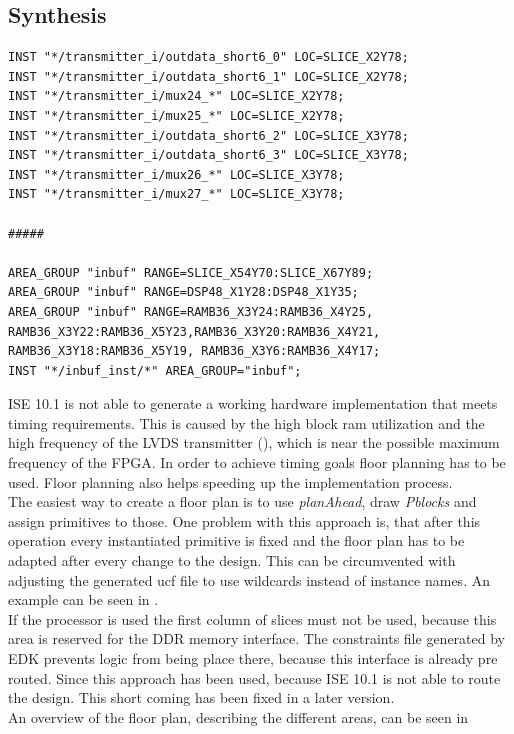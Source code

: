 \documentclass[11pt,technote,a4paper,onecolumn,dvips]{IEEEtran}
\begin{document}
\subsection{Synthesis}
\label{sec:synthesis}
\begin{lstlisting}[float,language=ucf,caption={Floor plan example},label=lst:floorplan,basicstyle=\ttfamily\tiny]
INST "*/transmitter_i/outdata_short6_0" LOC=SLICE_X2Y78;
INST "*/transmitter_i/outdata_short6_1" LOC=SLICE_X2Y78;
INST "*/transmitter_i/mux24_*" LOC=SLICE_X2Y78;
INST "*/transmitter_i/mux25_*" LOC=SLICE_X2Y78;
INST "*/transmitter_i/outdata_short6_2" LOC=SLICE_X3Y78;
INST "*/transmitter_i/outdata_short6_3" LOC=SLICE_X3Y78;
INST "*/transmitter_i/mux26_*" LOC=SLICE_X3Y78;
INST "*/transmitter_i/mux27_*" LOC=SLICE_X3Y78;

#####

AREA_GROUP "inbuf" RANGE=SLICE_X54Y70:SLICE_X67Y89;
AREA_GROUP "inbuf" RANGE=DSP48_X1Y28:DSP48_X1Y35;
AREA_GROUP "inbuf" RANGE=RAMB36_X3Y24:RAMB36_X4Y25, RAMB36_X3Y22:RAMB36_X5Y23,RAMB36_X3Y20:RAMB36_X4Y21, RAMB36_X3Y18:RAMB36_X5Y19, RAMB36_X3Y6:RAMB36_X4Y17;
INST "*/inbuf_inst/*" AREA_GROUP="inbuf";
\end{lstlisting}
ISE 10.1 is not able to generate a working hardware implementation that
meets timing requirements. This is caused by the high block ram utilization
and the high frequency of the LVDS transmitter (), which is
near the possible maximum frequency of the FPGA. In order to achieve timing
goals floor planning has to be used. Floor planning also helps speeding up
the implementation process.\\
The easiest way to create a floor plan is to use \emph{planAhead}, draw
\emph{Pblocks} and assign primitives to those. One problem with this
approach is, that after this operation every instantiated primitive
is fixed and the floor plan has to be adapted after every change to the
design. This can be circumvented with adjusting the generated ucf file
to use wildcards instead of instance names. An example can be seen in
.\\
If the processor is used the first column of slices must not be used, because
this area is reserved for the DDR memory interface. The constraints file
generated by EDK prevents logic from being place there, because this interface
is already pre routed. Since this approach has been used, because ISE 10.1 is
not able to route the design. This short coming has been fixed in a later
version.\\
An overview of the floor plan, describing the different areas, can be seen in
\end{document}
